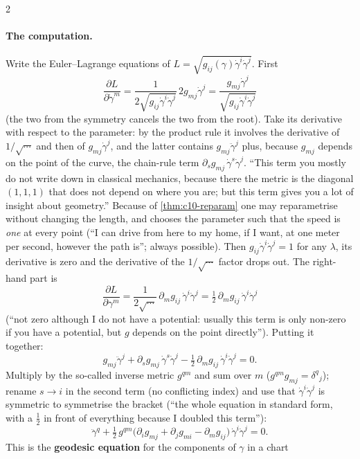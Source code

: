 \begin{paracol}{2}
\paragraph{The computation.} Write the Euler--Lagrange equations of $L=\sqrt{g_{ij}(\gamma)\dot\gamma^i\dot\gamma^j}$. First
\[
  \frac{\partial L}{\partial\dot\gamma^m}=\frac{1}{2\sqrt{g_{ij}\dot\gamma^i\dot\gamma^j}}\,2g_{mj}\dot\gamma^j=\frac{g_{mj}\dot\gamma^j}{\sqrt{g_{ij}\dot\gamma^i\dot\gamma^j}}
\]
(the two from the symmetry cancels the two from the root). Take its derivative with respect to the parameter: by the product rule it involves the derivative of $1/\sqrt{\cdots}$ and then of $g_{mj}\dot\gamma^j$, and the latter contains $g_{mj}\ddot\gamma^j$ plus, because $g_{mj}$ depends on the point of the curve, the chain-rule term $\partial_sg_{mj}\,\dot\gamma^s\dot\gamma^j$. ``This term you mostly do not write down in classical mechanics, because there the metric is the diagonal $(1,1,1)$ that does not depend on where you are; but this term gives you a lot of insight about geometry.''
Because of \cref{thm:c10-reparam} one may reparametrise without changing the length, and chooses the parameter such that the speed is \emph{one} at every point (``I can drive from here to my home, if I want, at one meter per second, however the path is''; always possible). Then $g_{ij}\dot\gamma^i\dot\gamma^j=1$ for any $\lambda$, its derivative is zero and the derivative of the $1/\sqrt{\cdots}$ factor drops out. The right-hand part is
\[
  \frac{\partial L}{\partial\gamma^m}=\frac{1}{2\sqrt{\cdots}}\,\partial_mg_{ij}\,\dot\gamma^i\dot\gamma^j=\tfrac12\,\partial_mg_{ij}\,\dot\gamma^i\dot\gamma^j
\]
(``not zero although I do not have a potential: usually this term is only non-zero if you have a potential, but $g$ depends on the point directly''). Putting it together:
\[
  g_{mj}\ddot\gamma^j+\partial_sg_{mj}\,\dot\gamma^s\dot\gamma^j-\tfrac12\,\partial_mg_{ij}\,\dot\gamma^i\dot\gamma^j=0.
\]
Multiply by the so-called inverse metric $g^{qm}$ and sum over $m$ ($g^{qm}g_{mj}=\delta^q{}_j$); rename $s\to i$ in the second term (no conflicting index) and use that $\dot\gamma^i\dot\gamma^j$ is symmetric to symmetrise the bracket (``the whole equation in standard form, with a $\tfrac12$ in front of everything because I doubled this term''):
\begin{equation}\label{eq:c10-geodesic}
  \ddot\gamma^q+\tfrac12\,g^{qm}\bigl(\partial_ig_{mj}+\partial_jg_{mi}-\partial_mg_{ij}\bigr)\,\dot\gamma^i\dot\gamma^j=0.
\end{equation}
This is the \textbf{geodesic equation} for the components of $\gamma$ in a chart

\end{paracol}
